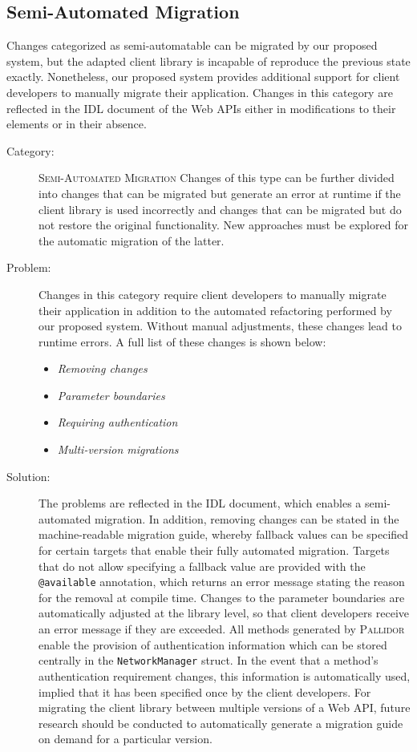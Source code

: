 \subsection{Semi-Automated Migration}\label{subsec:EvalSemiAutomated}
Changes categorized as semi-automatable can be migrated by our proposed system, but the adapted client library is incapable of reproduce the previous state exactly. Nonetheless, our proposed system provides additional support for client developers to manually migrate their application. Changes in this category are reflected in the IDL document of the Web APIs either in modifications to their elements or in their absence.


\begin{description}
	\item[Category:] \textsc{Semi-Automated Migration} \newline Changes of this type can be further divided into changes that can be migrated but generate an error at runtime if the client library is used incorrectly and changes that can be migrated but do not restore the original functionality. New approaches must be explored for the automatic migration of the latter.
	\item[Problem:] Changes in this category require client developers to manually migrate their application in addition to the automated refactoring performed by our proposed system. Without manual adjustments, these changes lead to runtime errors. A full list of these changes is shown below:
	\begin{itemize}
		\item \textit{Removing changes} 
		\item \textit{Parameter boundaries}
		\item \textit{Requiring authentication}
		\item \textit{Multi-version migrations}
	\end{itemize}
	\item[Solution:] The problems are reflected in the IDL document, which enables a semi-automated migration. In addition, removing changes can be stated in the machine-readable migration guide, whereby fallback values can be specified for certain targets that enable their fully automated migration. Targets that do not allow specifying a fallback value are provided with the \texttt{@available} annotation, which returns an error message stating the reason for the removal at compile time. Changes to the parameter boundaries are automatically adjusted at the library level, so that client developers receive an error message if they are exceeded. All methods generated by \textsc{Pallidor} enable the provision of authentication information which can be stored centrally in the \texttt{NetworkManager} struct. In the event that a method's authentication requirement changes, this information is automatically used, implied that it has been specified once by the client developers. For migrating the client library between multiple versions of a Web API, future research should be conducted to automatically generate a migration guide on demand for a particular version. 

\end{description}
